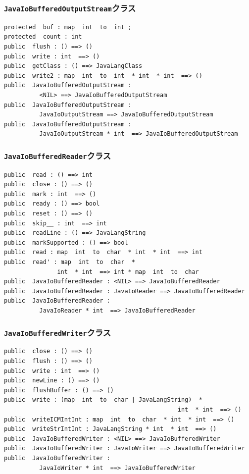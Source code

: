 \documentclass[\pformat,12pt]{jarticle}
\begin{document}
\subsubsection{\texttt{JavaIoBufferedOutputStream}クラス}
\begin{small}
\begin{verbatim}
protected  buf : map  int  to  int ;
protected  count : int
public  flush : () ==> ()
public  write : int  ==> ()
public  getClass : () ==> JavaLangClass
public  write2 : map  int  to  int  * int  * int  ==> ()
public  JavaIoBufferedOutputStream : 
          <NIL> ==> JavaIoBufferedOutputStream
public  JavaIoBufferedOutputStream : 
          JavaIoOutputStream ==> JavaIoBufferedOutputStream
public  JavaIoBufferedOutputStream : 
          JavaIoOutputStream * int  ==> JavaIoBufferedOutputStream
\end{verbatim}
\end{small}

\subsubsection{\texttt{JavaIoBufferedReader}クラス}
\begin{small}
\begin{verbatim}
public  read : () ==> int
public  close : () ==> ()
public  mark : int  ==> ()
public  ready : () ==> bool
public  reset : () ==> ()
public  skip__ : int  ==> int
public  readLine : () ==> JavaLangString
public  markSupported : () ==> bool
public  read : map  int  to  char  * int  * int  ==> int
public  read' : map  int  to  char  * 
               int  * int  ==> int * map  int  to  char
public  JavaIoBufferedReader : <NIL> ==> JavaIoBufferedReader
public  JavaIoBufferedReader : JavaIoReader ==> JavaIoBufferedReader
public  JavaIoBufferedReader : 
          JavaIoReader * int  ==> JavaIoBufferedReader
\end{verbatim}
\end{small}

\subsubsection{\texttt{JavaIoBufferedWriter}クラス}
\begin{small}
\begin{verbatim}
public  close : () ==> ()
public  flush : () ==> ()
public  write : int  ==> ()
public  newLine : () ==> ()
public  flushBuffer : () ==> ()
public  write : (map  int  to  char | JavaLangString)  * 
                                                 int  * int  ==> ()
public  writeICMIntInt : map  int  to  char  * int  * int  ==> ()
public  writeStrIntInt : JavaLangString * int  * int  ==> ()
public  JavaIoBufferedWriter : <NIL> ==> JavaIoBufferedWriter
public  JavaIoBufferedWriter : JavaIoWriter ==> JavaIoBufferedWriter
public  JavaIoBufferedWriter : 
          JavaIoWriter * int  ==> JavaIoBufferedWriter
\end{verbatim}
\end{small}
\end{document}
